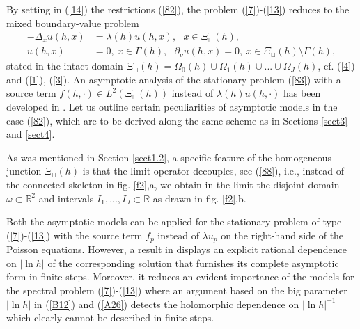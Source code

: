 \documentclass[11pt]{article}%
\numberwithin{equation}{section}
\begin{document}
By setting in (\ref{14}) the restrictions (\ref{82}), the problem
(\ref{7})-(\ref{13}) reduces to the mixed boundary-value problem%
\begin{align}
-\Delta_{x}u(h,x)  &  =\lambda(h)u(h,x),\ \ \ x\in\Xi_{\sqcup}(h),\label{83}\\
u(h,x)  &  =0,\ x\in\Gamma(h),\ \ \ \partial_{\nu}u(h,x)=0,\ x\in\Xi_{\sqcup
}(h)\setminus\Gamma(h),\nonumber
\end{align}
stated in the intact domain $\Xi_{\sqcup}(h)=\Omega_{0}(h)\cup\Omega
_{1}(h)\cup...\cup\Omega_{J}(h)$, cf. (\ref{4}) and (\ref{1}), (\ref{3}). An
asymptotic analysis of the stationary problem (\ref{83}) with a source term
$f(h,\cdot)\in L^{2}(\Xi_{\sqcup}(h))$ instead of $\lambda(h)u(h,\cdot)$ has
been developed in \cite[Sect. 2]{BuCaNa1}. Let us outline certain
peculiarities of asymptotic models in the case (\ref{82}), which are to be
derived along the same scheme as in Sections \ref{sect3} and \ref{sect4}.

As was mentioned in Section \ref{sect1.2}, a specific feature of the
homogeneous junction $\Xi_{\sqcup}(h)$ is that the limit operator decouples,
see (\ref{88}), i.e., instead of the connected skeleton in fig. \ref{f2},a, we
obtain in the limit the disjoint domain $\omega\subset\mathbb{R}^{2}$ and
intervals $I_{1},...,I_{J}\subset\mathbb{R}$ as drawn in fig. \ref{f2},b.

Both the asymptotic models can be applied for the stationary problem of type
(\ref{7})-(\ref{13}) with the source term $f_{p}$ instead of $\lambda u_{p}$
on the right-hand side of the Poisson equations. However, a result in
\cite{BuCaNa1} displays an explicit rational dependence on $|\ln h|$ of the
corresponding solution that furnishes its complete asymptotic form in finite
steps. Moreover, it reduces an evident importance of the models for the
spectral problem (\ref{7})-(\ref{13}) where an argument based on the big
parameter $|\ln h|$ in (\ref{B12}) and (\ref{A26}) detects the holomorphic
dependence on $|\ln h|^{-1}$ which clearly cannot be described in finite steps.
\end{document}
